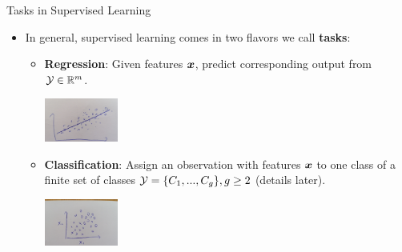 \documentclass[11pt,compress,t,notes=noshow, xcolor=table]{beamer}
\begin{document}
\begin{vbframe}{Tasks in Supervised Learning}

\begin{itemize}

  \item In general, supervised learning comes in two flavors we call 
  \textbf{tasks}:
  
  \begin{itemize}
  
    \item \textbf{Regression}: Given features $\bm{x}$, predict corresponding 
    output from $\mathcal{Y} \in \mathbb{R}^m$.
    
    \begin{center}
      \includegraphics[width = 0.2\textwidth]{figure_man/learner_opt.jpg} 
    \end{center}
    
    \item \textbf{Classification}: Assign an observation with features $\bm{x}$ to 
    one class of a finite set of classes $\mathcal{Y} = \{C_1,...,C_g\}, g \geq 2$
    (details later).
    
    \begin{center}
      \includegraphics[width = 0.2\textwidth]{figure_man/classif_sketch.jpg} 
    \end{center}

  \end{itemize}
  
\end{itemize}  

\end{vbframe}

\end{document}
